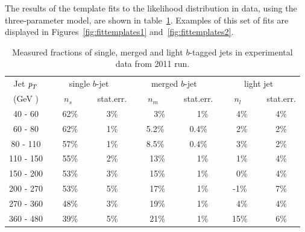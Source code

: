 The results of the template fits to the likelihood distribution in data, using the three-parameter model, are shown in table~\ref{tb:fitfractions}. Examples of this set of fits are displayed in Figures~\ref{fig:fittemplates1} and~\ref{fig:fittemplates2}.


\begin{table}[!hbt] %
\renewcommand{\arraystretch}{1.2}
\centering
\begin{tabular}{ | c || c | c || c | c || c | c ||}
  \hline
  Jet ${\emph{p}_{T}}$ & \multicolumn{2}{c||}{single $b$-jet} & \multicolumn{2}{c||}{merged $b$-jet} & \multicolumn{2}{c||}{~light jet~}\\ \cline{2-7}
    (GeV ) & ~~~$n_s$~~~~ & stat.err. & ~~~$n_m$~~~~ & stat.err.& ~~~$n_l$~~~~ & stat.err.\\ \hline
   40 - 60 &  62\% &  3\%  &  ~~3\%  &  ~~1\% &  ~4\%  &  4\%   \\ 
   60 - 80 &  62\% &  1\%  &  5.2\%  &  0.4\% &  ~2\%  &  2\%   \\ 
   80 - 110&  57\% &  1\%  &  8.5\%  &  0.4\% &  ~3\%  &  2\%   \\ 
  110 - 150&  55\% &  2\%  &  ~13\%  &  ~~1\% &  ~1\%  &  4\%   \\ 
  150 - 200&  53\% &  3\%  &  ~15\%  &  ~~1\% &  ~0\%  &  4\%   \\ 
  200 - 270&  53\% &  5\%  &  ~17\%  &  ~~1\% &  -1\%  &  7\%   \\ 
  270 - 360&  48\% &  3\%  &  ~19\%  &  ~~1\% &  ~4\%  &  4\%   \\ 
  360 - 480&  39\% &  5\%  &  ~21\%  &  ~~1\% &  15\%  &  6\%   \\ \hline
\end{tabular}
\caption{Measured fractions of single, merged and light $b$-tagged jets in experimental data from 2011 run.}
\label{tb:fitfractions}
\end{table}


